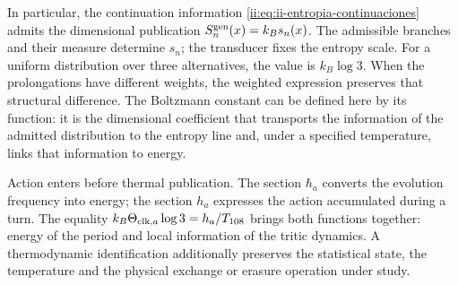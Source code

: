 In particular, the continuation information
\eqref{ii:eq:ii-entropia-continuaciones} admits the dimensional publication
\(S_n^{\rm gen}(x)=k_Bs_n(x)\). The admissible branches and their measure
determine \(s_n\); the transducer fixes the entropy scale. For
a uniform distribution over three alternatives, the value is
\(k_B\log3\). When the prolongations have different weights,
the weighted expression preserves that structural difference. The
Boltzmann constant can be defined here by its function: it is the
dimensional coefficient that transports the information of the
admitted distribution to the entropy line and, under a
specified temperature, links that information to energy.

Action enters before thermal publication. The section
\(\hbar_a\) converts the evolution frequency into energy;
the section \(h_a\) expresses the action accumulated during a turn.
The equality \(k_B\Theta_{{\rm clk},a}\log3=h_a/T_{108}\)
brings both functions together: energy of the period and local information of
the tritic dynamics. A thermodynamic identification additionally preserves
the statistical state, the temperature and the physical exchange or
erasure operation under study.
